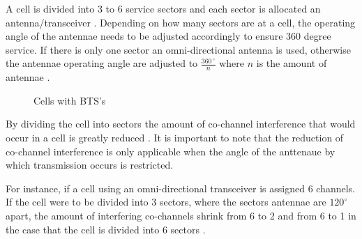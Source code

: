 A cell is divided into 3 to 6 service sectors and each sector is allocated an antenna/transceiver \cite{GSMSysEngin}. Depending on how many sectors are at a cell, the operating angle of the antennae needs to be adjusted accordingly to ensure 360 degree service. If there is only one sector an omni-directional antenna is used, otherwise the antennae operating angle are adjusted to $\frac{360\,^{\circ}}{n}$ where ${n}$ is the amount of antennae \cite{Eisenblatter}.
\begin{figure}[t!]
	\begin{centering}
		
		\caption{Cells with BTS's}
		\label{fig:GSMCell}
	\end{centering}
\end{figure}

By dividing the cell into sectors the amount of co-channel interference that would occur in a cell is greatly reduced \cite{GSMArchitectureProtocolsServices}. It is important to note that the reduction of co-channel interference is only applicable when the angle of the anttenaue by which transmission occurs is restricted\cite{GSMArchitectureProtocolsServices}.

For instance, if a cell using an omni-directional transceiver is assigned 6 channels. If the cell were to be divided into 3 sectors, where the sectors antennae are $120^\circ$ apart, the amount of interfering co-channels shrink from 6 to 2 and from 6 to 1 in the case that the cell is divided into 6 sectors \cite{GSMSysEngin,GSM92,GSMArchitectureProtocolsServices}.

